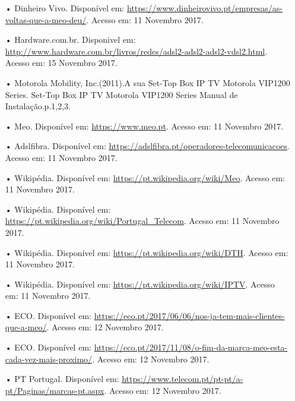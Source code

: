 \documentclass{report}
\begin{document}
\begin{itemize}

\item[•] Dinheiro Vivo. Disponível em: \url{https://www.dinheirovivo.pt/empresas/as-voltas-que-a-meo-deu/}. Acesso em: 11 Novembro 2017.
\item[•] Hardware.com.br. Disponivel em: \url{http://www.hardware.com.br/livros/redes/adsl2-adsl2-adsl2-vdsl2.html}. Acesso em: 15 Novembro 2017.
\item[•] Motorola Mobility, Inc.(2011).A sua Set-Top Box IP TV Motorola VIP1200 Series. Set-Top Box IP TV Motorola VIP1200 Series Manual de Instalação.p.1,2,3.
\item[•] Meo. Disponível em: \url{https://www.meo.pt}. Acesso em: 11 Novembro 2017.
\item[•] Adslfibra. Disponível em: \url{https://adslfibra.pt/operadores-telecomunicacoes}. Acesso em: 11 Novembro 2017.
\item[•] Wikipédia. Disponível em: \url{https://pt.wikipedia.org/wiki/Meo}. Acesso em: 11 Novembro 2017.
\item[•] Wikipédia. Disponível em: \url{https://pt.wikipedia.org/wiki/Portugal_Telecom}. Acesso em: 11 Novembro 2017.
\item[•] Wikipédia. Disponível em: \url{https://pt.wikipedia.org/wiki/DTH}. Acesso em: 11 Novembro 2017.
\item[•] Wikipédia. Disponível em: \url{https://pt.wikipedia.org/wiki/IPTV}. Acesso em: 11 Novembro 2017.
\item[•] ECO. Disponível em: \url{https://eco.pt/2017/06/06/nos-ja-tem-mais-clientes-que-a-meo/}. Acesso em: 12 Novembro 2017.
\item[•] ECO. Disponível em: \url{https://eco.pt/2017/11/08/o-fim-da-marca-meo-esta-cada-vez-mais-proximo/}. Acesso em: 12 Novembro 2017.
\item[•] PT Portugal. Disponível em: \url{https://www.telecom.pt/pt-pt/a-pt/Paginas/marcas-pt.aspx}. Acesso em: 12 Novembro 2017.


\end{itemize}
\end{document}
